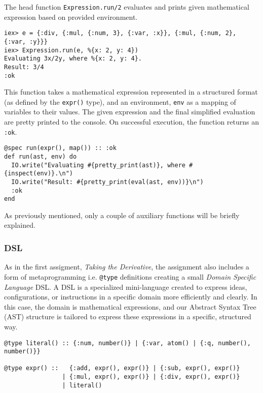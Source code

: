 \documentclass[a4paper,11pt]{article}
\begin{document}
The head function
\texttt{Expression.run/2}
evaluates and prints given mathematical expression based on provided environment.
\begin{verbatim}
iex> e = {:div, {:mul, {:num, 3}, {:var, :x}}, {:mul, {:num, 2}, {:var, :y}}}
iex> Expression.run(e, %{x: 2, y: 4})
Evaluating 3x/2y, where %{x: 2, y: 4}.
Result: 3/4
:ok
\end{verbatim}
This function takes a mathematical expression represented in a structured format
(as defined by the
\texttt{expr()} type),
and an environment,
\texttt{env} as a mapping of variables to their values.
The given expression and the final simplified evaluation are pretty printed to the console.
On successful execution, the function returns an
\texttt{:ok}.
\begin{verbatim}
@spec run(expr(), map()) :: :ok
def run(ast, env) do
  IO.write("Evaluating #{pretty_print(ast)}, where #{inspect(env)}.\n")
  IO.write("Result: #{pretty_print(eval(ast, env))}\n")
  :ok
end
\end{verbatim}
As previously mentioned, only a couple of auxiliary functions will be briefly explained.
\subsubsection*{DSL}
As in the first assigment, \emph{Taking the Derivative}, the assignment also includes a form of metaprogramming
i.e. \texttt{@type} definitions creating a small \emph{Domain Specific Language} DSL.
A DSL is a specialized mini-language created to express ideas, configurations, or instructions in a specific domain
more efficiently and clearly.
In this case, the domain is mathematical expressions,
and our Abstract Syntax Tree (AST) structure is tailored to express these expressions in a specific, structured way.
\begin{verbatim}
@type literal() :: {:num, number()} | {:var, atom() | {:q, number(), number()}}

@type expr() ::   {:add, expr(), expr()} | {:sub, expr(), expr()}
                | {:mul, expr(), expr()} | {:div, expr(), expr()}
                | literal()
\end{verbatim}
\end{document}
